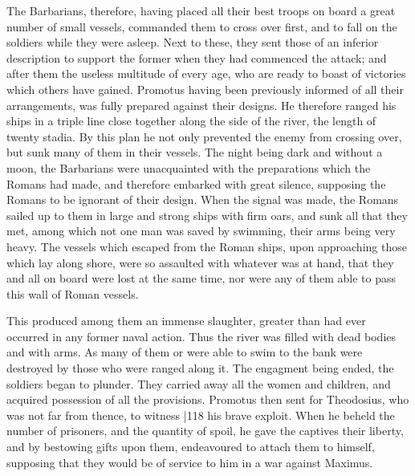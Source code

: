The Barbarians, therefore, having placed all their best troops on board a great number of small vessels, commanded them to cross over first, and to fall on the soldiers while they were asleep. Next to these, they sent those of an inferior description to support the former when they had commenced the attack; and after them the useless multitude of every age, who are ready to boast of victories which others have gained. Promotus having been previously informed of all their arrangements, was fully prepared against their designs. He therefore ranged his ships in a triple line close together along the side of the river, the length of twenty stadia. By this plan he not only prevented the enemy from crossing over, but sunk many of them in their vessels. The night being dark and without a moon, the Barbarians were unacquainted with the preparations which the Romans had made, and therefore embarked with great silence, supposing the Romans to be ignorant of their design. When the signal was made, the Romans sailed up to them in large and strong ships with firm oars, and sunk all that they met, among which not one man was saved by swimming, their arms being very heavy. The vessels which escaped from the Roman ships, upon approaching those which lay along shore, were so assaulted with whatever was at hand, that they and all on board were lost at the same time, nor were any of them able to pass this wall of Roman vessels.

This produced among them an immense slaughter, greater than had ever occurred in any former naval action. Thus the river was filled with dead bodies and with arms. As many of them or were able to swim to the bank were destroyed by those who were ranged along it. The engagment being ended, the soldiers began to plunder. They carried away all the women and children, and acquired possession of all the provisions. Promotus then sent for Theodosius, who was not far from thence, to witness
|118
his brave exploit. When he beheld the number of prisoners, and the quantity of spoil, he gave the captives their liberty, and by bestowing gifts upon them, endeavoured to attach them to himself, supposing that they would be of service to him in a war against Maximus.

